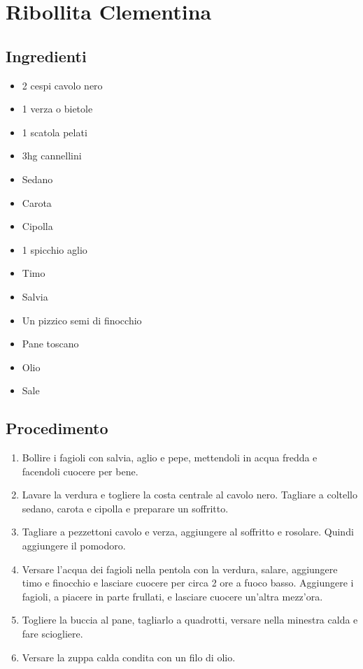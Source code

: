 \section{Ribollita Clementina}
\subsection{Ingredienti}
\begin{itemize}
\item 2 cespi cavolo nero  
\item 1 verza o bietole  
\item 1 scatola pelati  
\item 3hg cannellini   
\item Sedano  
\item Carota  
\item Cipolla  
\item 1 spicchio aglio  
\item Timo  
\item Salvia  
\item Un pizzico semi di finocchio  
\item Pane toscano  
\item Olio  
\item Sale
\end{itemize}
\subsection{Procedimento}
\begin{enumerate}
\item  Bollire i fagioli con salvia, aglio e pepe, mettendoli in acqua fredda e facendoli cuocere per bene.  
\item  Lavare la verdura e togliere la costa centrale al cavolo nero. Tagliare a coltello sedano, carota e cipolla e preparare un soffritto.   
\item  Tagliare a pezzettoni cavolo e verza, aggiungere al soffritto e rosolare. Quindi aggiungere il pomodoro.  
\item  Versare l'acqua dei fagioli nella pentola con la verdura, salare, aggiungere timo e finocchio e lasciare cuocere per circa 2 ore a fuoco basso. Aggiungere i fagioli, a piacere in parte frullati, e lasciare cuocere un'altra mezz'ora.  
\item  Togliere la buccia al pane, tagliarlo a quadrotti, versare nella minestra calda e fare sciogliere.  
\item  Versare la zuppa calda condita con un filo di olio.
\end{enumerate}
